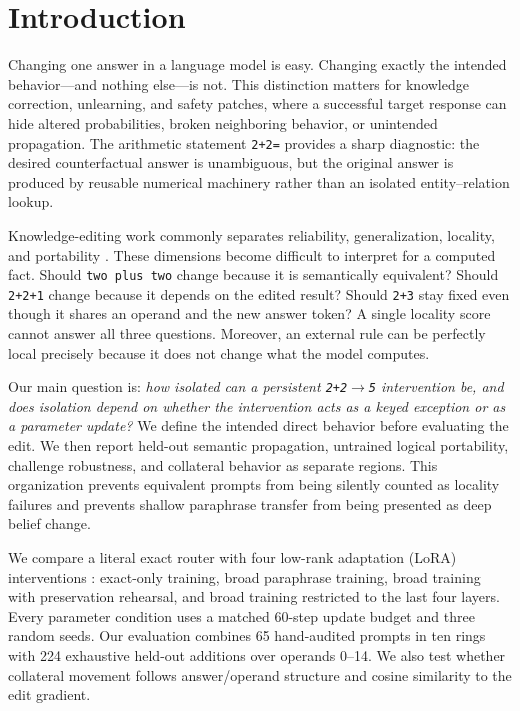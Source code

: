 \section{Introduction}
\label{sec:introduction}

Changing one answer in a language model is easy. Changing exactly the intended behavior---and nothing else---is not. This distinction matters for knowledge correction, unlearning, and safety patches, where a successful target response can hide altered probabilities, broken neighboring behavior, or unintended propagation. The arithmetic statement \texttt{2+2=} provides a sharp diagnostic: the desired counterfactual answer is unambiguous, but the original answer is produced by reusable numerical machinery rather than an isolated entity--relation lookup.

Knowledge-editing work commonly separates reliability, generalization, locality, and portability \cite{meng2022rome,meng2023memit,zhang2024knowedit}. These dimensions become difficult to interpret for a computed fact. Should \texttt{two plus two} change because it is semantically equivalent? Should \texttt{2+2+1} change because it depends on the edited result? Should \texttt{2+3} stay fixed even though it shares an operand and the new answer token? A single locality score cannot answer all three questions. Moreover, an external rule can be perfectly local precisely because it does not change what the model computes.

Our main question is: \emph{how isolated can a persistent \texttt{2+2}$\rightarrow$\texttt{5} intervention be, and does isolation depend on whether the intervention acts as a keyed exception or as a parameter update?} We define the intended direct behavior before evaluating the edit. We then report held-out semantic propagation, untrained logical portability, challenge robustness, and collateral behavior as separate regions. This organization prevents equivalent prompts from being silently counted as locality failures and prevents shallow paraphrase transfer from being presented as deep belief change.

We compare a literal exact router with four low-rank adaptation (LoRA) interventions \cite{hu2022lora}: exact-only training, broad paraphrase training, broad training with preservation rehearsal, and broad training restricted to the last four layers. Every parameter condition uses a matched 60-step update budget and three random seeds. Our evaluation combines 65 hand-audited prompts in ten rings with 224 exhaustive held-out additions over operands 0--14. We also test whether collateral movement follows answer/operand structure and cosine similarity to the edit gradient.

